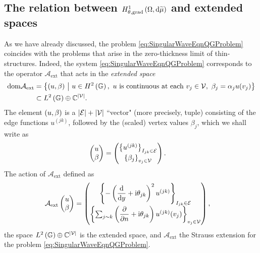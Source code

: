\subsection{The relation between $H^1_{\theta, \mathrm{grad}}\left( \Omega, \mathrm{d}\widetilde{\mu} \right)$ and extended spaces} \label{ssec:ExtendedSpaces}
As we have already discussed, the problem \eqref{eq:SingularWaveEqnQGProblem} coincides with the problems that arise in the zero-thickness limit of thin-structures.
Indeed, the system \eqref{eq:SingularWaveEqnQGProblem} corresponds to the operator $\mathcal{A}_{\mathrm{ext}}$ that acts in the \emph{extended space}
\begin{align*}
	\mathrm{dom}\mathcal{A}_{\mathrm{ext}} 
	&= \left\{  (u, \beta) \ \middle\vert \  u\in H^2\left( \mathbb{G} \right), \ u \text{ is continuous at each } v_j\in\mathcal{V}, \ \beta_j=\alpha_j u(v_j)  \right\} \\
	& \subset L^2\left( \mathbb{G} \right)\oplus\mathbb{C}^{\left\lvert \mathcal{V} \right\rvert}.
\end{align*}
The element $\left( u,\beta \right)$ is a $\left\lvert \mathcal{E} \right\rvert+\left\lvert \mathcal{V} \right\rvert$ ``vector" (more precisely, tuple) consisting of the edge functions $u^{(jk)}$, followed by the (scaled) vertex values $\beta_j$, which we shall write as
\begin{align*}
	\begin{pmatrix} u \\ \beta \end{pmatrix}
	&= \begin{pmatrix} \left\{ u^{(jk)} \right\}_{I_{jk}\in\mathcal{E}} \\ \left\{ \beta_j \right\}_{v_j\in\mathcal{V}} \end{pmatrix}.
\end{align*}
The action of $\mathcal{A}_{\mathrm{ext}}$ defined as
\begin{align*}
	\mathcal{A}_{\mathrm{ext}} \begin{pmatrix} u \\ \beta \end{pmatrix}
	&= 
	\begin{pmatrix}
		\left\{ -\left( \dfrac{\mathrm{d}}{\mathrm{d}y}+\mathrm{i}\theta_{jk} \right)^2 u^{(jk)} \right\}_{I_{jk}\in\mathcal{E}} \\ 
		\left\{ \sum_{j\sim k}\left(  \dfrac{\partial }{\partial n} + \mathrm{i}\theta_{jk}  \right)u^{(jk)}(v_j) \right\}_{v_j\in\mathcal{V}}
	\end{pmatrix},
\end{align*}
the space $L^2\left( \mathbb{G} \right)\oplus\mathbb{C}^{\left\lvert \mathcal{V} \right\rvert}$ is the extended space, and $\mathcal{A}_{\mathrm{ext}}$ the Strauss extension for the problem \eqref{eq:SingularWaveEqnQGProblem}.

